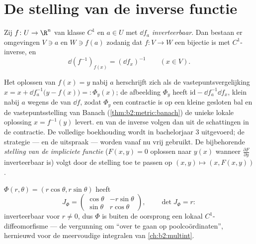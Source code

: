 \section{De stelling van de inverse functie}

\begin{theorem}\label{thm:b2:diffcalc:inverse}
Zij $f \colon U \to \R^n$ van klasse $C^1$ en $a \in U$ met $\dd
f_a$ \emph{inverteerbaar}. Dan bestaan er  omgevingen $V \ni a$
en $W \ni f(a)$ zodanig dat $f \colon V \to W$ een bijectie is met
$C^1$-inverse, en
\[
\dd (f^{-1})_{f(x)} = (\dd f_x)^{-1} \qquad (x \in V).
\]
\end{theorem}
\admitted

\begin{remark}
Het oplossen van $f(x) = y$ nabij $a$ herschrijft zich als de
vastepuntsvergelijking $x = x + \dd f_a^{-1}\bigl(y - f(x)\bigr)
=: \Phi_y(x)$; de afbeelding $\Phi_y$ heeft 
$\mathrm{id} - \dd f_a^{-1}\dd f_x$, klein nabij $a$ wegens de
 van $\dd f$, zodat $\Phi_y$ een contractie is op een
kleine gesloten bal en de vastepuntsstelling van Banach
(\cref{thm:b2:metric:banach}) de unieke lokale oplossing $x =
f^{-1}(y)$ levert.  en  van de
inverse volgen dan uit de schattingen in de contractie. De volledige
boekhouding wordt in bachelorjaar 3 uitgevoerd; de strategie --- en
de uitspraak --- worden vanaf nu vrij gebruikt. De bijbehorende
\emph{stelling van de impliciete functie} ($F(x, y) = 0$ oplossen
naar $y(x)$ wanneer $\frac{\partial F}{\partial y}$ inverteerbaar
is) volgt door de stelling toe te passen op $(x, y) \mapsto (x,
F(x,y))$.
\end{remark}

\begin{example}[Poolcoördinaten]\label{ex:b2:diffcalc:polar}
$\Phi(r, \theta) = (r\cos\theta, r\sin\theta)$ heeft 
\[
J_\Phi = \begin{pmatrix} \cos\theta & -r\sin\theta\\ \sin\theta &
r\cos\theta \end{pmatrix},
\qquad \det J_\Phi = r :
\]
inverteerbaar voor $r \neq 0$, dus $\Phi$ is buiten de oorsprong
een lokaal $C^1$-diffeomorfisme --- de vergunning om ``over te
gaan op poolcoördinaten'', hernieuwd voor de meervoudige
integralen van \cref{ch:b2:multint}.
\end{example}


